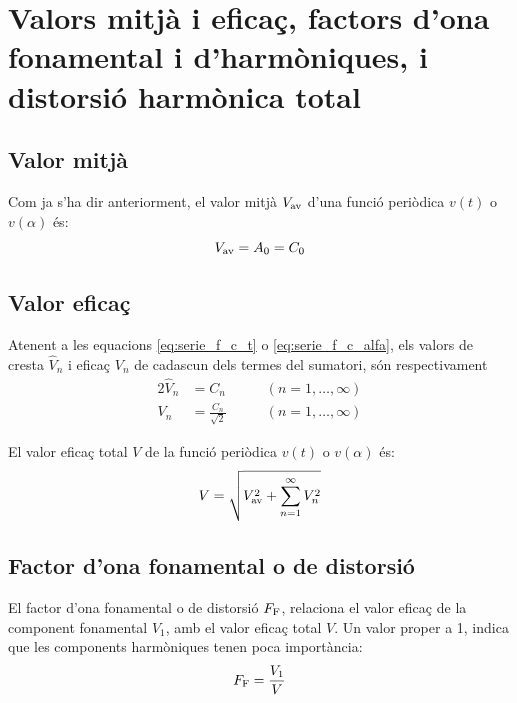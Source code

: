 \section{Valors mitj\`{a} i efica\c{c}, factors d'ona fonamental i
d'harm\`{o}niques, i distorsi\'{o} harm\`{o}nica total}

\subsection{Valor mitj\`{a}}

Com ja s'ha dir anteriorment, el valor mitj\`{a} $V_\mathrm{av}$ d'una
funci\'{o} peri\`{o}dica $v(t)$ o $v(\alpha)$ \'{e}s:
\begin{equation}
    V_\mathrm{av} = A_0 = C_0
\end{equation}

\subsection{Valor efica\c{c}}

Atenent a les equacions  \eqref{eq:serie_f_c_t} o
\eqref{eq:serie_f_c_alfa}, els valors de cresta $\hat{V}_n$ i efica\c{c}
$V_n$ de cadascun dels termes del sumatori, s\'{o}n respectivament
\begin{alignat}{2}
    \hat{V}_n &= C_n &\qquad(n=1,\ldots,\infty)\\[0.5ex]
    V_n &= \frac{C_n}{\sqrt{2}} &\qquad(n=1,\ldots,\infty)
\end{alignat}

El valor efica\c{c} total $V$ de  la funci\'{o} peri\`{o}dica $v(t)$ o
$v(\alpha)$ \'{e}s:
\begin{equation}
    V = \sqrt{V_\mathrm{av}^2 + \sum_{n=1}^{\infty}V^2_n} \label{eq:val_ef_fourier}
\end{equation}

\subsection{Factor d'ona fonamental o de distorsi\'{o}}

El factor d'ona fonamental o de distorsi\'{o} $F_\mathrm{F}$, relaciona el
valor efica\c{c} de la component fonamental $V_1$, amb el valor efica\c{c}
total $V$. Un valor proper a 1, indica  que les components
harm\`{o}niques tenen poca import\`{a}ncia:
\begin{equation}
    F_\mathrm{F} = \frac{V_1}{V}
\end{equation}

